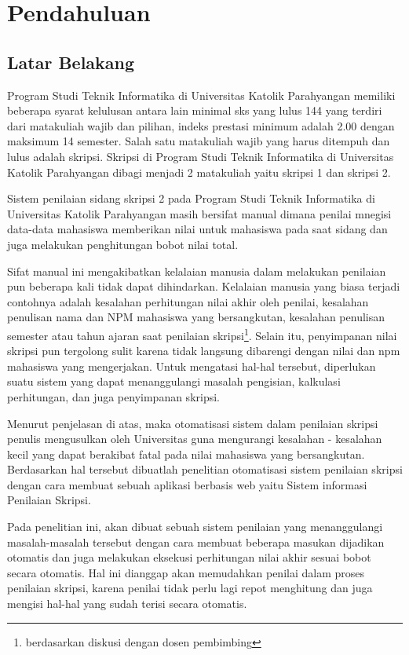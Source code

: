 \chapter{Pendahuluan}
\label{chap:pendahuluan}

\section{Latar Belakang}
\label{sec:latarBelakang}

	Program Studi Teknik Informatika di Universitas Katolik Parahyangan memiliki beberapa syarat kelulusan antara lain minimal sks yang lulus 144 yang terdiri dari matakuliah wajib dan pilihan, indeks prestasi minimum adalah 2.00 dengan maksimum 14 semester. Salah satu matakuliah wajib yang harus ditempuh dan lulus adalah skripsi. Skripsi di Program Studi Teknik Informatika di Universitas Katolik Parahyangan dibagi menjadi 2 matakuliah yaitu skripsi 1 dan skripsi 2. 
	
	Sistem penilaian sidang skripsi 2 pada Program Studi Teknik Informatika di Universitas Katolik Parahyangan masih bersifat manual dimana penilai mnegisi data-data mahasiswa  memberikan nilai untuk mahasiswa pada saat sidang dan juga melakukan penghitungan bobot nilai total. 
	
	Sifat manual ini mengakibatkan kelalaian manusia dalam melakukan penilaian pun beberapa kali tidak dapat dihindarkan. Kelalaian manusia yang biasa terjadi contohnya adalah kesalahan perhitungan nilai akhir oleh penilai, kesalahan penulisan nama dan NPM mahasiswa yang bersangkutan, kesalahan penulisan semester atau tahun ajaran saat penilaian skripsi\footnote{berdasarkan diskusi dengan dosen pembimbing}. Selain itu, penyimpanan nilai skripsi pun tergolong sulit karena tidak langsung dibarengi dengan nilai dan npm mahasiswa yang mengerjakan. Untuk mengatasi hal-hal tersebut, diperlukan suatu sistem yang dapat menanggulangi masalah pengisian, kalkulasi perhitungan, dan juga penyimpanan skripsi.
	
	Menurut penjelasan di atas, maka otomatisasi sistem dalam penilaian skripsi penulis mengusulkan oleh Universitas guna mengurangi kesalahan - kesalahan kecil yang dapat berakibat fatal pada nilai mahasiswa yang bersangkutan. Berdasarkan hal tersebut dibuatlah penelitian otomatisasi sistem penilaian skripsi dengan cara membuat sebuah aplikasi berbasis web yaitu Sistem informasi Penilaian Skripsi.
		
	Pada penelitian ini, akan dibuat sebuah sistem penilaian yang menanggulangi masalah-masalah tersebut dengan cara membuat beberapa masukan dijadikan otomatis dan juga melakukan eksekusi perhitungan nilai akhir sesuai bobot secara otomatis. Hal ini dianggap akan memudahkan penilai dalam proses penilaian skripsi, karena penilai tidak perlu lagi repot menghitung dan juga mengisi hal-hal yang sudah terisi secara otomatis.
	
